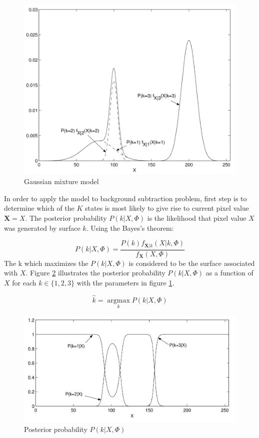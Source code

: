 \begin{figure}
    \centering
    \includegraphics[width=\linewidth]{images/gaussian-mixture-model.png}
    \caption[Gaussian mixture model]{Gaussian mixture model\cite{power2002understanding}}
    \label{fig:gaussian-mixture-model}
\end{figure}

In order to apply the model to background subtraction problem, first step is to determine which of the $K$ states is most likely to give rise to current pixel value $\mathbf{X}=X$. The posterior probability $P(k|X,\Phi)$ is the likelihood that pixel value $X$ was generated by surface $k$. Using the Bayes's theorem:

$$ P(k|X,\Phi) = \frac{P(k)f_{\mathbf{X}|k}(X|k,\Phi)}{f_\mathbf{X}(X,\Phi)} $$
The k which maximizes the $P(k|X,\Phi) $ is considered to be the surface associated with $X$. Figure \ref{fig:gaussian-posterior-probability} illustrates the posterior probability $P(k|X,\Phi) $ as a function of $X$ for each $k\in \{  1,2,3 \}$ with the parameters in figure \ref{fig:gaussian-mixture-model}.

$$ \hat{k}=\operatorname*{argmax}_k P(k|X,\Phi)$$
\begin{figure}
    \centering
    \includegraphics[width=\linewidth]{images/gaussian-posterior-probability.PNG}
    \caption[Posterior probability]{Posterior probability  $P(k|X,\Phi) $\cite{power2002understanding}}
    \label{fig:gaussian-posterior-probability}
\end{figure}


